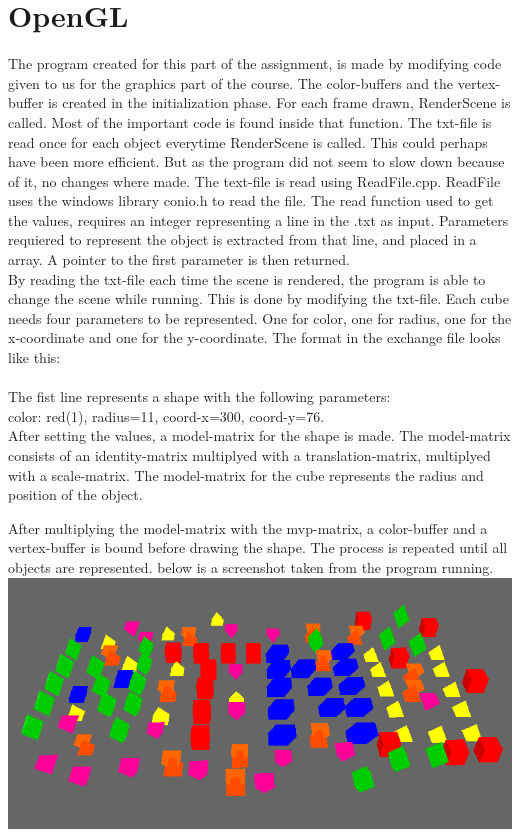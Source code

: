 \lstset{language = c}
\section{OpenGL}
The program created for this part of the assignment, 
is made by modifying code given to us for the graphics part of the course. 
The color-buffers and the vertex-buffer is created in the initialization phase. 
For each frame drawn, RenderScene is called. Most of the important code is found inside that function.
The txt-file is read once for each object everytime RenderScene is called. This could perhaps have been more efficient. But as the program did not seem to slow down because of it, no changes where made.
The text-file is read using ReadFile.cpp.
ReadFile uses the windows library conio.h to read the file. 
The read function used to get the values, requires an integer representing a line in the .txt as input.
Parameters requiered to represent the object is extracted from that line, and placed in a array.
A pointer to the first parameter is then returned.
\\
By reading the txt-file each time the scene is rendered, the program is able to change the scene while running.
This is done by modifying the txt-file. 
Each cube needs four parameters to be represented.
One for color, one for radius, one for the x-coordinate and one for the y-coordinate. The format in the exchange file looks like this:
\\

\mbox{}\\
The fist line represents a shape with the following parameters:
\\color: red(1), radius=11, coord-x=300, coord-y=76.
\\
After setting the values, a model-matrix for the shape is made. 
The model-matrix consists of an identity-matrix multiplyed with a translation-matrix, multiplyed with a scale-matrix. 
The model-matrix for the cube represents the radius and position of the object.
 
After multiplying the model-matrix with the mvp-matrix, a color-buffer and a vertex-buffer is bound before drawing the shape.
The process is repeated until all objects are represented. 
below is a screenshot taken from the program running.
\\
\includegraphics[scale=0.75]{Screen1.png}
